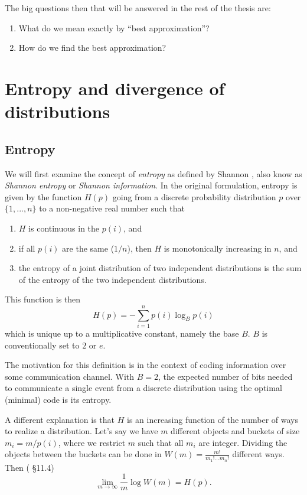 \documentclass[12pt,vu]{adammath}
\theoremstyle{plain}
\theoremstyle{definition}
\theoremstyle{remark}
\begin{document}
The big questions then that will be answered in the rest of the thesis are:
\begin{enumerate}
\item What do we mean exactly by ``best approximation''?
\item How do we find the best approximation?
\end{enumerate}

\chapter{Entropy and divergence of distributions}\label{divergences}

\section{Entropy}\label{entropy}
We will first examine the concept of \emph{entropy} as defined by Shannon \cite{shannonentropy}, also know as \emph{Shannon entropy} or \emph{Shannon information}.
In the original formulation, entropy is given by the function $H(p)$ going from a discrete probability distribution $p$ over $\{ 1, ..., n \}$ to a non-negative real number such that
\begin{enumerate}
\item $H$ is continuous in the $p(i)$, and
\item if all $p(i)$ are the same ($1/n$), then $H$ is monotonically increasing in $n$, and
\item the entropy of a joint distribution of two independent distributions is the sum of the entropy of the two independent distributions.
\end{enumerate}
This function is then
\begin{equation}\label{ent}
H(p) = -\sum_{i=1}^n p(i) \log_B p(i)
\end{equation}
which is unique up to a multiplicative constant, namely the base $B$.
$B$ is conventionally set to $2$ or $e$.

The motivation for this definition is in the context of coding information over some communication channel.
With $B = 2$, the expected number of bits needed to communicate a single event from a discrete distribution using the optimal (minimal) code is its entropy.

A different explanation is that $H$ is an increasing function of the number of ways to realize a distribution.
Let's say we have $m$ different objects and buckets of size $m_i = m / p(i)$, where we restrict $m$ such that all $m_i$ are integer.
Dividing the objects between the buckets can be done in $W(m) = \frac{m!}{m_1! ... m_n!}$ different ways.
Then (\cite{ptlos} \S 11.4)
$$\lim_{m \to \infty} \frac{1}{m} \log W(m) = H(p).$$
\end{document}

